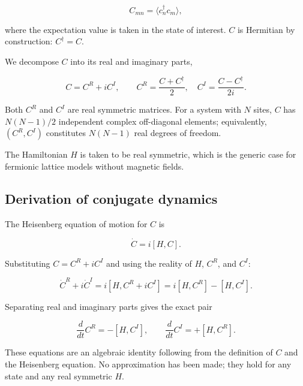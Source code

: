 \documentclass[aps,pra,preprint,groupedaddress,amsmath,amssymb,floatfix]{revtex4-2}
\begin{document}
\begin{equation}
C_{mn} = \langle c^\dagger_n c_m \rangle,
\label{eq:C_def}
\end{equation}

where the expectation value is taken in the state of interest. $C$ is Hermitian by construction: $C^\dagger = C$.

We decompose $C$ into its real and imaginary parts,

\begin{equation}
C = C^R + i C^I,
\qquad
C^R = \frac{C + C^\dagger}{2},\quad
C^I = \frac{C - C^\dagger}{2i}.
\label{eq:C_decomp}
\end{equation}

Both $C^R$ and $C^I$ are real symmetric matrices. For a system with $N$ sites, $C$ has $N(N-1)/2$ independent complex off-diagonal elements; equivalently, $(C^R, C^I)$ constitutes $N(N-1)$ real degrees of freedom.

The Hamiltonian $H$ is taken to be real symmetric, which is the generic case for fermionic lattice models without magnetic fields.

\subsection{Derivation of conjugate dynamics}
\label{sec:derivation}

The Heisenberg equation of motion for $C$ is

\begin{equation}
\dot{C} = i[H, C].
\label{eq:heisenberg}
\end{equation}

Substituting $C = C^R + i C^I$ and using the reality of $H$, $C^R$, and $C^I$:

\begin{equation}
\dot{C}^R + i\dot{C}^I = i[H, C^R + iC^I] = i[H, C^R] - [H, C^I].
\label{eq:heisenberg_expand}
\end{equation}

Separating real and imaginary parts gives the exact pair

\begin{equation}
\boxed{\frac{d}{dt} C^R = -[H, C^I], \qquad
\frac{d}{dt} C^I = +[H, C^R]}.
\label{eq:conjugate_dynamics}
\end{equation}

These equations are an algebraic identity following from the definition of $C$ and the Heisenberg equation. No approximation has been made; they hold for any state and any real symmetric $H$.
\end{document}
